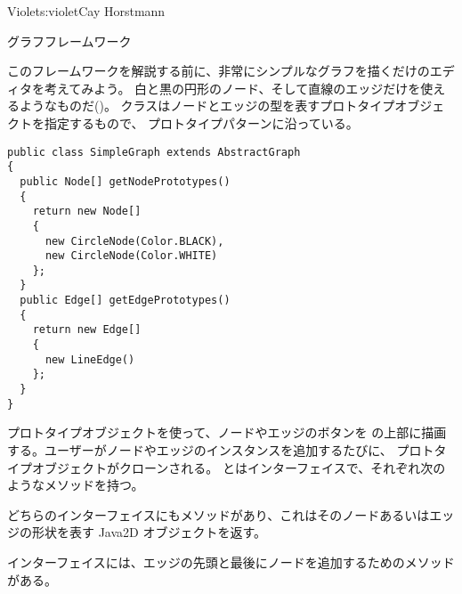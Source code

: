 \begin{aosachapter}{Violet}{s:violet}{Cay Horstmann}
\begin{aosasect1}{グラフフレームワーク}

このフレームワークを解説する前に、非常にシンプルなグラフを描くだけのエディタを考えてみよう。
白と黒の円形のノード、そして直線のエッジだけを使えるようなものだ()。
クラスはノードとエッジの型を表すプロトタイプオブジェクトを指定するもので、
プロトタイプパターンに沿っている。

\pagebreak

\begin{verbatim}
public class SimpleGraph extends AbstractGraph
{
  public Node[] getNodePrototypes()
  {
    return new Node[] 
    {
      new CircleNode(Color.BLACK),
      new CircleNode(Color.WHITE)
    };
  }
  public Edge[] getEdgePrototypes()
  {
    return new Edge[] 
    {
      new LineEdge()
    };
  }
}
\end{verbatim}

プロトタイプオブジェクトを使って、ノードやエッジのボタンを
の上部に描画する。ユーザーがノードやエッジのインスタンスを追加するたびに、
プロトタイプオブジェクトがクローンされる。
とはインターフェイスで、それぞれ次のようなメソッドを持つ。

\begin{aosaitemize}

\item どちらのインターフェイスにもメソッドがあり、これはそのノードあるいはエッジの形状を表す
  Java2D オブジェクトを返す。

\item {}インターフェイスには、エッジの先頭と最後にノードを追加するためのメソッドがある。


\end{aosaitemize}
\end{aosasect1}
\end{aosachapter}

